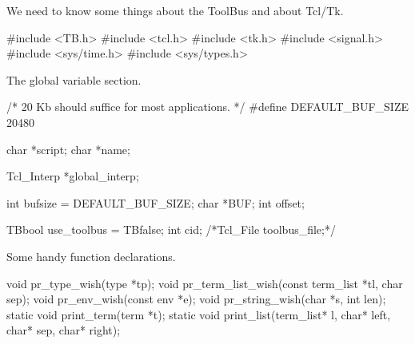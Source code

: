 

We need to know some things about the ToolBus and about Tcl/Tk.

\nwenddocs{}\endmoddef\let\nwnotused=\nwoutput{}
#include <TB.h>
#include <tcl.h>
#include <tk.h>
#include <signal.h>
#include <sys/time.h>
#include <sys/types.h>
\nwendcode{}\nwdocspar


The global variable section.

\nwenddocs{}\endmoddef\let\nwnotused=\nwoutput{}
/* 20 Kb should suffice for most applications. */
#define DEFAULT_BUF_SIZE        20480

char *script;
char *name;

Tcl_Interp *global_interp;

int bufsize = DEFAULT_BUF_SIZE;
char *BUF;
int offset;

TBbool use_toolbus = TBfalse;
int cid;
/*Tcl_File toolbus_file;*/
\nwendcode{}\nwdocspar


Some handy function declarations.

\nwenddocs{}\endmoddef\let\nwnotused=\nwoutput{}
void pr_type_wish(type *tp);
void pr_term_list_wish(const term_list *tl, char sep);
void pr_env_wish(const env *e);
void pr_string_wish(char *s, int len);
static void print_term(term *t);
static void print_list(term_list* l, char* left, char* sep, char* right);
\nwendcode{}\nwdocspar



